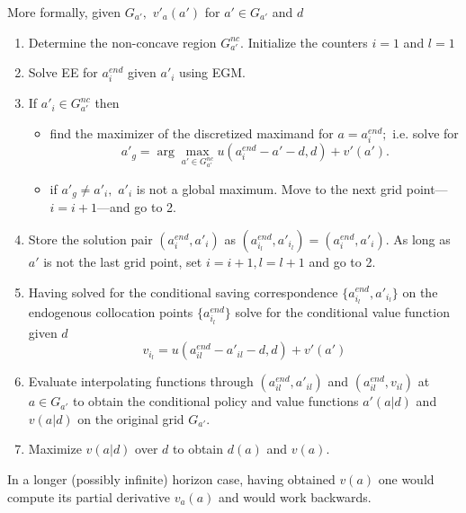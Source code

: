 \documentclass[a4paper,dvips,12pt]{article}
\begin{document}
More formally, given $G_{a'},$ $v'_{a}(a')$ for $a'\in G_{a'}$ and $d$
\begin{enumerate}
\item Determine the non-concave region $G^{nc}_{a'}.$ Initialize the
  counters $i=1$ and $l=1$
\item Solve EE for $a^{end}_{i}$ given $a'_{i}$ using EGM.
\item If $a'_{i}\in G^{nc}_{a'}$ then
  \begin{itemize}
  \item find the maximizer of the discretized maximand for
    $a=a^{end}_{i};$ i.e. solve for
    \[
    a'_{g}=\arg \max _{a'\in G_{a'}^{nc}}u(a^{end}_{i}-a'-d,d)+v'(a').
    \]
  \item if $a'_{g}\neq a'_{i},$ $a'_{i}$ is not a global maximum. Move
    to the next grid point---$i=i+1$---and go to 2.
  \end{itemize}
\item Store the solution pair $(a^{end}_{i},a'_{i})$ as
  $(a^{end}_{i_{l}},a'_{i_{l}})=(a^{end}_{i},a'_{i}).$ As long as $a'$
  is not the last grid point, set $i=i+1, l=l+1$ and go to 2.
\item Having solved for the conditional saving correspondence
  $\{a^{end}_{i_{l}},a'_{i_{l}}\}$ on the endogenous collocation points
  $\{a^{end}_{i_{l}}\}$ solve for the conditional value function given
  $d$
\[
v_{i_{l}}=u(a_{il}^{end}-a'_{il}- d,d)+v'(a')
\]
\item Evaluate interpolating functions through $(a_{il}^{end},a'_{il})$
  and $(a_{il}^{end},v_{il})$ at $a\in G_{a'}$ to obtain the conditional
  policy and value functions $a'(a|d)$ and $v(a|d)$ on the original grid
  $ G_{a'}.$
\item Maximize $v(a|d)$ over $d$ to obtain $d(a)$ and $v(a)$.
  \end{enumerate}

  In a longer (possibly infinite) horizon case, having obtained $v(a)$
  one would compute its partial derivative $v_{a}(a)$ and would work
  backwards.
\end{document}
